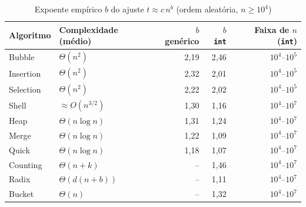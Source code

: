 \begin{table}[htbp]\centering\small
\caption{Expoente empírico $b$ do ajuste $t \approx c\,n^b$ (ordem aleatória, $n \ge 10^4$)}\label{tab:expoentes}
\begin{tabular}{llrrr}
\toprule
Algoritmo & Complexidade (médio) & $b$ genérico & $b$ \texttt{int} & Faixa de $n$ (\texttt{int}) \\
\midrule
Bubble & $\Theta(n^2)$ & 2,19 & 2,46 & $10^{4}$--$10^{5}$ \\
Insertion & $\Theta(n^2)$ & 2,32 & 2,01 & $10^{4}$--$10^{5}$ \\
Selection & $\Theta(n^2)$ & 2,22 & 2,02 & $10^{4}$--$10^{5}$ \\
Shell & $\approx O(n^{3/2})$ & 1,30 & 1,16 & $10^{4}$--$10^{7}$ \\
Heap & $\Theta(n\log n)$ & 1,31 & 1,24 & $10^{4}$--$10^{7}$ \\
Merge & $\Theta(n\log n)$ & 1,22 & 1,09 & $10^{4}$--$10^{7}$ \\
Quick & $\Theta(n\log n)$ & 1,18 & 1,07 & $10^{4}$--$10^{7}$ \\
Counting & $\Theta(n+k)$ & -- & 1,46 & $10^{4}$--$10^{7}$ \\
Radix & $\Theta(d(n+b))$ & -- & 1,11 & $10^{4}$--$10^{7}$ \\
Bucket & $\Theta(n)$ & -- & 1,32 & $10^{4}$--$10^{7}$ \\
\bottomrule
\end{tabular}
\end{table}